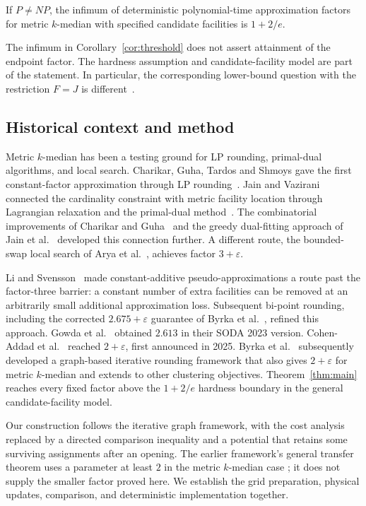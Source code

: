 \begin{corollary}\label{cor:threshold}
If \(P\ne NP\), the infimum of deterministic polynomial-time approximation
factors for metric \(k\)-median with specified candidate facilities is \(1+2/e\).
\end{corollary}

The infimum in Corollary~\ref{cor:threshold} does not assert attainment of the
endpoint factor. The hardness assumption and candidate-facility model are part
of the statement. In particular, the corresponding lower-bound question with
the restriction \(F=J\) is different~\cite{AnandLee2024}.

\subsection{Historical context and method}

Metric \(k\)-median has been a testing ground for LP rounding,
primal-dual algorithms, and local search. Charikar, Guha, Tardos and
Shmoys gave the first constant-factor approximation through LP
rounding~\cite{CharikarGuhaTardosShmoys2002}. Jain and
Vazirani connected the cardinality constraint with metric facility
location through Lagrangian relaxation and the primal-dual
method~\cite{JainVazirani2001}. The combinatorial improvements of
Charikar and Guha~\cite{CharikarGuha1999} and the greedy dual-fitting
approach of Jain et al.~\cite{JainEtAl2003} developed this connection
further. A different route, the bounded-swap local search of Arya et
al.~\cite{Arya2004}, achieves factor \(3+\varepsilon\).

Li and Svensson~\cite{LiSvensson2016} made constant-additive
pseudo-approximations a route past the factor-three barrier: a constant
number of extra facilities can be removed at an arbitrarily small
additional approximation loss. Subsequent bi-point rounding, including
the corrected \(2.675+\varepsilon\) guarantee of Byrka et
al.~\cite{ByrkaEtAl2017}, refined this approach. Gowda et
al.~\cite{GowdaEtAl2023} obtained \(2.613\) in their SODA 2023 version.
Cohen-Addad et al.~\cite{CGLSS2026} reached
\(2+\varepsilon\), first announced in 2025. Byrka et
al.~\cite{ByrkaEtAl2026} subsequently developed a graph-based iterative
rounding framework that also gives \(2+\varepsilon\) for metric
\(k\)-median and extends to other clustering objectives.
Theorem~\ref{thm:main} reaches every fixed factor above the
\(1+2/e\) hardness boundary in the general candidate-facility model.

Our construction follows the iterative graph framework, with the
cost analysis replaced by a directed comparison inequality and a
potential that retains some surviving assignments after an opening.
The earlier framework's general transfer theorem uses a parameter at
least \(2\) in the metric \(k\)-median case
\cite[Theorem~6.1]{ByrkaEtAl2026}; it does not supply the smaller factor
proved here. We establish the grid preparation, physical updates,
comparison, and deterministic implementation together.

